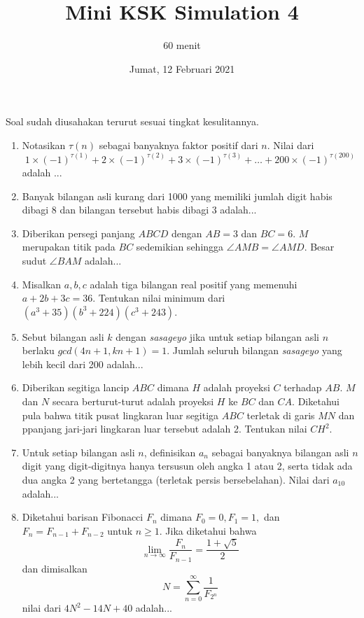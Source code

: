 \documentclass[12pt]{scrartcl}
\title{Mini KSK Simulation 4}
\author{60 menit}
\date{Jumat, 12 Februari 2021}
\begin{document}
	\maketitle

\renewcommand*\contentsname{Daftar Isi}
\tableofcontents

\newpage
	
	Soal sudah diusahakan terurut sesuai tingkat kesulitannya.
	\begin{enumerate}
		\item
		Notasikan $\tau(n)$ sebagai banyaknya faktor positif dari $n$. Nilai dari $$1 \times(-1)^{\tau(1)} + 2 \times (-1)^{\tau(2)} + 3 \times (-1)^{\tau(3)} + \dots + 200 \times (-1)^{\tau(200)}$$ adalah ...
		
		\item
		Banyak bilangan asli kurang dari 1000 yang memiliki jumlah digit habis dibagi 8 dan bilangan tersebut habis dibagi 3 adalah...
		
		\item Diberikan persegi panjang $ABCD$ dengan $AB = 3$ dan $BC = 6$. $M$ merupakan titik pada $BC$ sedemikian sehingga $\angle AMB = \angle AMD$. Besar sudut $\angle BAM$ adalah...
		
		\item
		Misalkan $a,b,c$ adalah tiga bilangan real positif yang memenuhi $a+2b+3c=36$. Tentukan nilai minimum dari $(a^3+35)(b^3+224)(c^3+243).$
		
		\item
		Sebut bilangan asli $k$ dengan \textit{sasageyo} jika untuk setiap bilangan asli $n$ berlaku $gcd(4n+1,kn+1)=1$. Jumlah seluruh bilangan \textit{sasageyo} yang lebih kecil dari 200 adalah...
		
		\item
		Diberikan segitiga lancip $ABC$ dimana $H$ adalah proyeksi $C$ terhadap $AB$. $M$ dan $N$ secara berturut-turut adalah proyeksi $H$ ke $BC$ dan $CA$. Diketahui pula bahwa titik pusat lingkaran luar segitiga $ABC$ terletak di garis $MN$ dan ppanjang jari-jari lingkaran luar tersebut adalah 2. Tentukan nilai $CH^2$.
		
		\item
		Untuk setiap bilangan asli $n$, definisikan $a_n$ sebagai banyaknya bilangan asli $n$ digit yang digit-digitnya hanya tersusun oleh angka 1 atau 2, serta tidak ada dua angka 2 yang bertetangga (terletak persis bersebelahan). Nilai dari $a_{10}$ adalah...
		
		\item
		Diketahui barisan Fibonacci ${F_n}$ dimana $F_0 = 0 , F_1 = 1,$ dan $F_n = F_{n-1} + F_{n-2}$ untuk $n \ge 1$. Jika diketahui bahwa $$\lim\limits_{n \rightarrow \infty} \dfrac{F_n}{F_{n-1}} = \dfrac{1+\sqrt{5}}{2}$$ dan dimisalkan $$N = \sum_{n = 0}^{\infty} \dfrac{1}{F_{2^n}}$$ nilai dari $4N^2-14N +40$ adalah...
	\end{enumerate}
		
\end{document}
